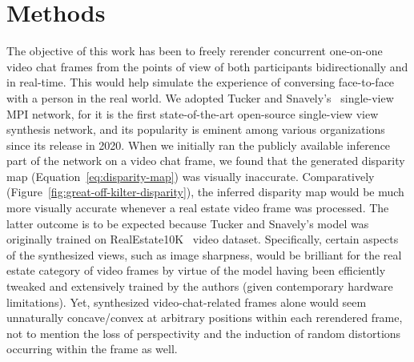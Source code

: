 \chapter{Methods}\label{ch3:methods}

The objective of this work has been to freely rerender concurrent one-on-one video chat frames from the points of view of both participants bidirectionally and in real-time. This would help simulate the experience of conversing face-to-face with a person in the real world. We adopted Tucker and Snavely's~\cite{single_view_mpi} single-view MPI network, for it is the first state-of-the-art open-source single-view view synthesis network, and its popularity is eminent among various organizations since its release in 2020. When we initially ran the publicly available inference part of the network on a video chat frame, we found that the generated disparity map (Equation~\ref{eq:disparity-map}) was visually inaccurate. Comparatively (Figure~\ref{fig:great-off-kilter-disparity}), the inferred disparity map would be much more visually accurate whenever a real estate video frame was processed. The latter outcome is to be expected because Tucker and Snavely's model was originally trained on RealEstate10K~\cite{zhou2018stereo} video dataset. Specifically, certain aspects of the synthesized views, such as image sharpness, would be brilliant for the real estate category of video frames by virtue of the model having been efficiently tweaked and extensively trained by the authors (given contemporary hardware limitations). Yet, synthesized video-chat-related frames alone would seem unnaturally concave/convex at arbitrary positions within each rerendered frame, not to mention the loss of perspectivity and the induction of random distortions occurring within the frame as well.

